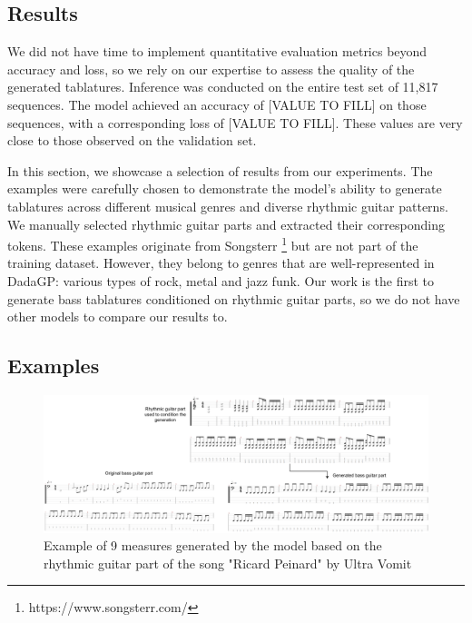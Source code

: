 \subsection{Results}

We did not have time to implement quantitative evaluation metrics beyond accuracy and loss, so we rely on our expertise to assess the quality of the generated tablatures.
Inference was conducted on the entire test set of 11,817 sequences.
The model achieved an accuracy of [VALUE TO FILL] on those sequences, with a corresponding loss of [VALUE TO FILL].
These values are very close to those observed on the validation set.

In this section, we showcase a selection of results from our experiments.
The examples were carefully chosen to demonstrate the model's ability to generate tablatures across different musical genres and diverse rhythmic guitar patterns.
We manually selected rhythmic guitar parts and extracted their corresponding tokens.
These examples originate from Songsterr \footnote{https://www.songsterr.com/} but are not part of the training dataset.
However, they belong to genres that are well-represented in DadaGP: various types of rock, metal and jazz funk.
Our work is the first to generate bass tablatures conditioned on rhythmic guitar parts, so we do not have other models to compare our results to.

\subsection{Examples}


\begin{figure}[!ht]
    \centering
    \includegraphics[width=\linewidth]{../images-figures/gen_ricard_peinard.png}
    \caption{Example of 9 measures generated by the model based on the rhythmic guitar part of the song "Ricard Peinard" by Ultra Vomit}
    \label{fig:gen_ricard_peinard}
\end{figure}

